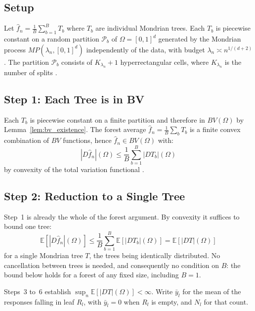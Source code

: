 \documentclass[12pt,a4paper]{article}
\numberwithin{equation}{section}
\theoremstyle{plain}
\theoremstyle{definition}
\newcommand{\E}{\mathbb{E}}
\newcommand{\BV}{BV(\Omega)}
\newcommand{\fn}{\hat{f}_n}
\begin{document}
	\subsection{Setup}
	
	Let $\fn = \frac{1}{B}\sum_{b=1}^B T_b$ where $T_b$ are individual Mondrian
	trees. Each $T_b$ is piecewise constant on a random partition $\mathcal{P}_b$
	of $\Omega = [0,1]^d$ generated by the Mondrian process $MP(\lambda_n, [0,1]^d)$
	independently of the data, with budget $\lambda_n \asymp n^{1/(d+2)}$
	\citep{mourtada2017mondrian}. The partition $\mathcal{P}_b$ consists of
	$K_{\lambda_n} + 1$ hyperrectangular cells, where $K_{\lambda_n}$ is the
	number of splits \citep{roy2009mondrian}.
	
	\subsection{Step 1: Each Tree is in BV}
	
	Each $T_b$ is piecewise constant on a finite partition and therefore in
	$\BV$ by Lemma~\ref{lem:bv_existence}. The forest average $\fn =
	\frac{1}{B}\sum_b T_b$ is a finite convex combination of $BV$ functions,
	hence $\fn \in \BV$ with:
	\begin{equation}
		|D\fn|(\Omega) \leq \frac{1}{B} \sum_{b=1}^B |DT_b|(\Omega)
	\end{equation}
	by convexity of the total variation functional
	\citep[Proposition~3.6]{ambrosio2000bv}.
	
	\subsection{Step 2: Reduction to a Single Tree}

	Step~1 is already the whole of the forest argument. By convexity it suffices
	to bound one tree:
	\begin{equation}
		\E\!\left[|D\fn|(\Omega)\right]
		\leq \frac{1}{B}\sum_{b=1}^B \E\!\left[|DT_b|(\Omega)\right]
		= \E\!\left[|DT|(\Omega)\right]
		\label{eq:forest_convexity}
	\end{equation}
	for a single Mondrian tree $T$, the trees being identically distributed. No
	cancellation between trees is needed, and consequently no condition on $B$:
	the bound below holds for a forest of any fixed size, including $B = 1$.

	Steps~3 to~6 establish $\sup_n \E[|DT|(\Omega)] < \infty$. Write
	$\bar{y}_l$ for the mean of the responses falling in leaf $R_l$, with
	$\bar{y}_l = 0$ when $R_l$ is empty, and $N_l$ for that count.
\end{document}
